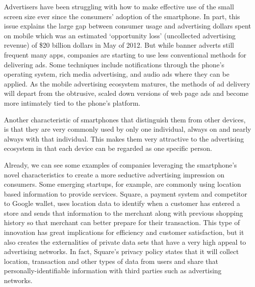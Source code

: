 Advertisers have been struggling with how to make effective use of the small screen size ever since the consumers' adoption of the smartphone. In part, this issue explains the large gap between consumer usage and advertising dollars spent on mobile which was an estimated `opportunity loss' (uncollected advertising revenue) of \$20 billion dollars in May of 2012\cite{meeker}. 
But while banner adverts still frequent many apps, companies are starting to use less conventional methods for delivering ads. Some techniques include notifications through the phone's operating system, rich media advertising, and audio ads where they can be applied. As the mobile advertising ecosystem matures, the methods of ad delivery will depart from the obtrusive, scaled down versions of web page ads and become more intimately tied to the phone's platform. 



Another characteristic of smartphones that distinguish them from other devices, is that they are very commonly used by only one individual, always on and nearly always with that individual. This makes them very attractive to the advertising ecosystem in that each device can be regarded as one specific person. 

Already, we can see some examples of companies leveraging the smartphone's novel characteristics to create a more seductive advertising impression on consumers. 
Some emerging startups, for example, are commonly using location based information to provide services. Square, a payment system and competitor to Google wallet, uses location data to identify when a customer has entered a store and sends that information to the merchant along with previous shopping history so that merchant can better prepare for their transaction\cite{square}. This type of innovation has great implications for efficiency and customer satisfaction, but it also creates the externalities of private data sets that have a very high appeal to advertising networks. In fact, Square's privacy policy states that it will collect location, transaction and other types of data from users and share that personally-identifiable information with third parties such as advertising networks\cite{square-privacy}. 

